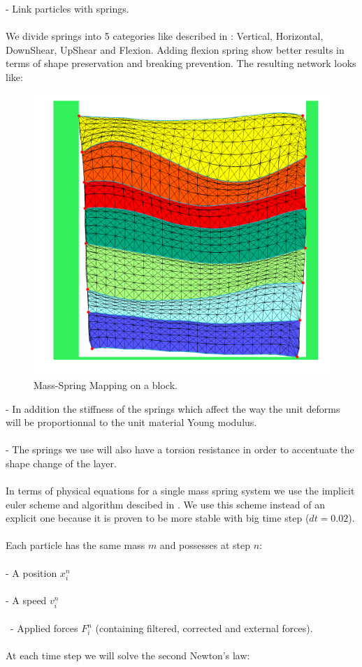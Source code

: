 \documentclass[12pt, a4paper]{report} %
\begin{document}
\indent	- Link particles with springs. \\\\We divide springs into 5 categories like described in \cite{cloth}: Vertical, Horizontal, DownShear, UpShear and Flexion. Adding flexion spring show better results in terms of shape preservation and breaking prevention. The resulting network looks like:\\
	
	\begin{figure}[H]
	\centering
	\includegraphics[scale=0.5]{springMapping.png}
	\caption{Mass-Spring Mapping on a block.}
	\end{figure}
	
	\indent	- In addition the stiffness of the springs which affect the way the unit deforms will be proportionnal to the unit material Young modulus. \\\\
\indent	- The springs we use will also have a torsion resistance in order to accentuate the shape change of the layer.\\\\
In terms of physical equations for a single mass spring system we use the implicit euler scheme and algorithm descibed in \cite{caltech}. We use this scheme instead of an explicit one because it is proven to be more stable with big time step ($dt = 0.02$).\\\\ 
Each particle has the same mass $m$ and possesses at step $n$:\\\\
\indent	- A position  $x_i^n$\\\\
\indent	- A speed $v_i^n$ \\\\\
\indent	- Applied forces $F_i^n$ (containing filtered, corrected and external forces).\\\\
At each time step we will solve the second Newton's law:\\
\end{document}
